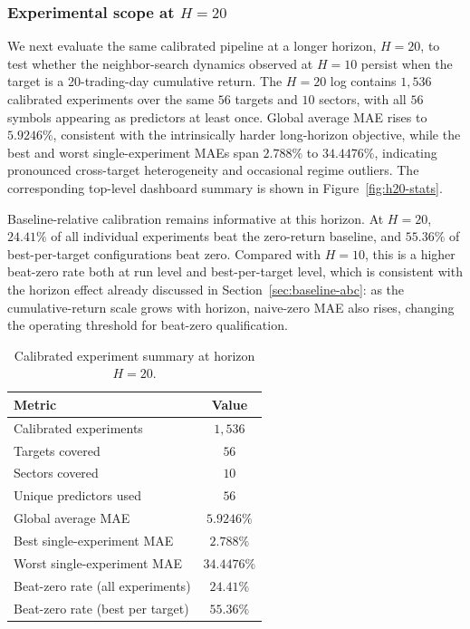 \documentclass[12pt,a4paper,titlepage]{article}
\begin{document}
\subsubsection{Experimental scope at \(H=20\)}
\label{sec:scope-h20}

We next evaluate the same calibrated pipeline at a longer horizon, \(H=20\), to test whether the neighbor-search dynamics observed at \(H=10\) persist when the target is a 20-trading-day cumulative return. The \(H=20\) log contains \(1{,}536\) calibrated experiments over the same \(56\) targets and \(10\) sectors, with all \(56\) symbols appearing as predictors at least once. Global average MAE rises to \(5.9246\%\), consistent with the intrinsically harder long-horizon objective, while the best and worst single-experiment MAEs span \(2.788\%\) to \(34.4476\%\), indicating pronounced cross-target heterogeneity and occasional regime outliers. The corresponding top-level dashboard summary is shown in Figure~\ref{fig:h20-stats}.

Baseline-relative calibration remains informative at this horizon. At \(H=20\), \(24.41\%\) of all individual experiments beat the zero-return baseline, and \(55.36\%\) of best-per-target configurations beat zero. Compared with \(H=10\), this is a higher beat-zero rate both at run level and best-per-target level, which is consistent with the horizon effect already discussed in Section~\ref{sec:baseline-abc}: as the cumulative-return scale grows with horizon, naive-zero MAE also rises, changing the operating threshold for beat-zero qualification.

\begin{table}[htbp]
\centering
\small
\caption{Calibrated experiment summary at horizon \(H=20\).}
\label{tab:h20-summary}
\begin{tabular}{lc}
\toprule
Metric & Value \\
\midrule
Calibrated experiments & \(1{,}536\) \\
Targets covered & \(56\) \\
Sectors covered & \(10\) \\
Unique predictors used & \(56\) \\
Global average MAE & \(5.9246\%\) \\
Best single-experiment MAE & \(2.788\%\) \\
Worst single-experiment MAE & \(34.4476\%\) \\
Beat-zero rate (all experiments) & \(24.41\%\) \\
Beat-zero rate (best per target) & \(55.36\%\) \\
\bottomrule
\end{tabular}
\end{table}
\end{document}
